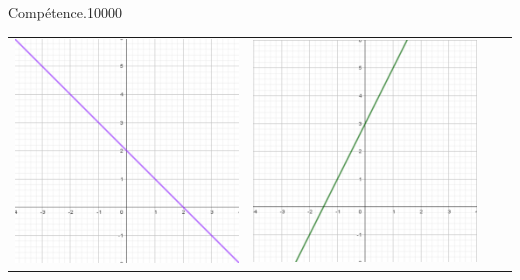 \begin{pageAuto}
\begin{ExoAutoN}{Compétence.}{1}{0}{0}{0}{0}
\begin{tabular}{|M{.4\linewidth}|M{.17\linewidth}|M{.17\linewidth}|M{.17\linewidth}|}
\includegraphics[width=\linewidth]{FIG/image895.png} 
&
\includegraphics[width=\linewidth]{FIG/image909.png} 
&

\end{tabular}
\end{ExoAutoN}
\end{pageAuto}
